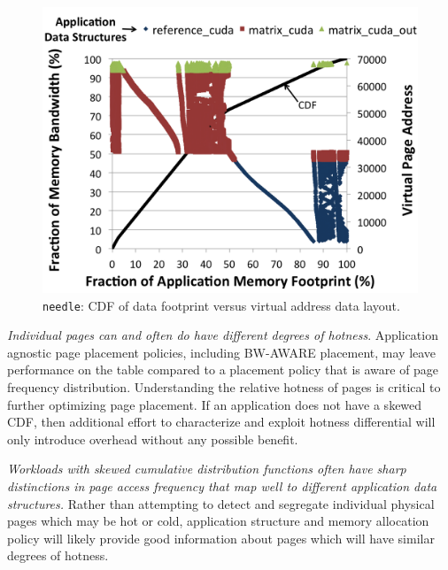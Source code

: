 \begin{figure}[t]
    \centering
    \includegraphics[width=0.9\columnwidth]{asplos2015/figures/needleannotated.png}
    \caption{{\tt needle}: CDF of data footprint versus virtual address data layout.}
    \label{fig:cdfannotation-needle}
\end{figure}

\emph{Individual pages can and often do have different degrees of hotness}.
Application agnostic page placement policies, including BW-AWARE placement, may leave performance 
on the table compared to a placement policy that is aware of page frequency distribution. 
Understanding the relative hotness of pages
is critical to further optimizing page placement.  If an application does not have a skewed CDF, 
then additional effort to characterize and exploit hotness differential will only introduce 
overhead without any possible benefit.

\emph{Workloads with skewed cumulative distribution functions often have sharp
distinctions in page access frequency that map well to different application 
data structures.}  Rather than attempting to detect and segregate individual physical pages 
which may be hot or cold, application structure and memory allocation policy
will likely provide good information about pages which will have similar degrees of hotness.

